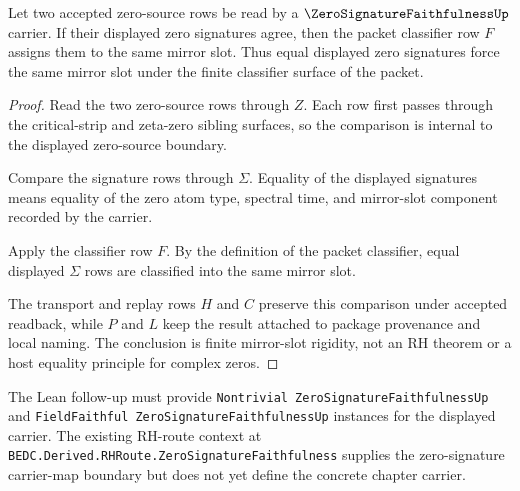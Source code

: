 \begin{theorem}
\label{thm:zero-signature-faithfulness-mirror-slot-rigidity}
Let two accepted zero-source rows be read by a $\ZeroSignatureFaithfulnessUp$ carrier. If their displayed zero signatures agree, then the packet classifier row $F$ assigns them to the same mirror slot. Thus equal displayed zero signatures force the same mirror slot under the finite classifier surface of the packet.
\end{theorem}
\begin{proof}
Read the two zero-source rows through $Z$. Each row first passes through the critical-strip and zeta-zero sibling surfaces, so the comparison is internal to the displayed zero-source boundary.

Compare the signature rows through $\Sigma$. Equality of the displayed signatures means equality of the zero atom type, spectral time, and mirror-slot component recorded by the carrier.

Apply the classifier row $F$. By the definition of the packet classifier, equal displayed $\Sigma$ rows are classified into the same mirror slot.

The transport and replay rows $H$ and $C$ preserve this comparison under accepted readback, while $P$ and $L$ keep the result attached to package provenance and local naming. The conclusion is finite mirror-slot rigidity, not an RH theorem or a host equality principle for complex zeros.
\end{proof}



The Lean follow-up must provide \texttt{Nontrivial ZeroSignatureFaithfulnessUp} and \texttt{FieldFaithful ZeroSignatureFaithfulnessUp} instances for the displayed carrier. The existing RH-route context at \texttt{BEDC.Derived.RHRoute.ZeroSignatureFaithfulness} supplies the zero-signature carrier-map boundary but does not yet define the concrete chapter carrier.

